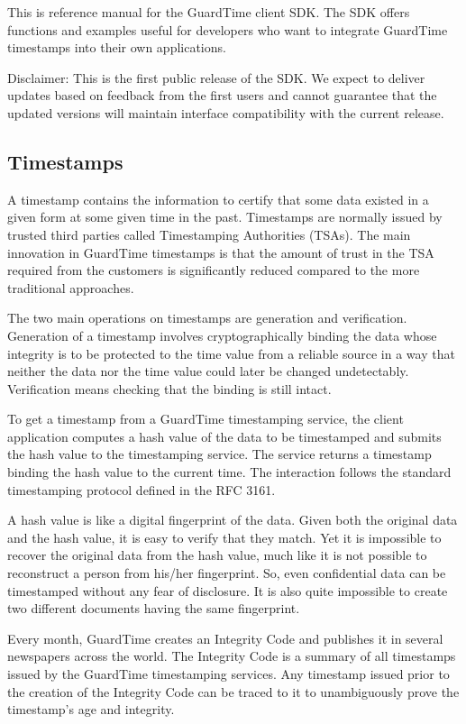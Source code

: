 This is reference manual for the GuardTime client SDK. The SDK offers functions and examples useful for developers who want to integrate GuardTime timestamps into their own applications.

Disclaimer: This is the first public release of the SDK. We expect to deliver updates based on feedback from the first users and cannot guarantee that the updated versions will maintain interface compatibility with the current release.

\subsection*{Timestamps}

A timestamp contains the information to certify that some data existed in a given form at some given time in the past. Timestamps are normally issued by trusted third parties called Timestamping Authorities (TSAs). The main innovation in GuardTime timestamps is that the amount of trust in the TSA required from the customers is significantly reduced compared to the more traditional approaches.

The two main operations on timestamps are generation and verification. Generation of a timestamp involves cryptographically binding the data whose integrity is to be protected to the time value from a reliable source in a way that neither the data nor the time value could later be changed undetectably. Verification means checking that the binding is still intact.

To get a timestamp from a GuardTime timestamping service, the client application computes a hash value of the data to be timestamped and submits the hash value to the timestamping service. The service returns a timestamp binding the hash value to the current time. The interaction follows the standard timestamping protocol defined in the RFC 3161.

A hash value is like a digital fingerprint of the data. Given both the original data and the hash value, it is easy to verify that they match. Yet it is impossible to recover the original data from the hash value, much like it is not possible to reconstruct a person from his/her fingerprint. So, even confidential data can be timestamped without any fear of disclosure. It is also quite impossible to create two different documents having the same fingerprint.

Every month, GuardTime creates an Integrity Code and publishes it in several newspapers across the world. The Integrity Code is a summary of all timestamps issued by the GuardTime timestamping services. Any timestamp issued prior to the creation of the Integrity Code can be traced to it to unambiguously prove the timestamp's age and integrity.

